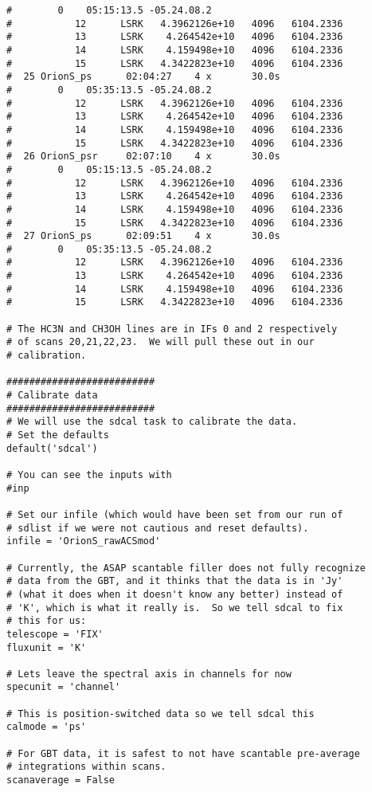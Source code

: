 \begin{verbatim}
#        0    05:15:13.5 -05.24.08.2
#           12      LSRK   4.3962126e+10   4096   6104.2336
#           13      LSRK    4.264542e+10   4096   6104.2336
#           14      LSRK    4.159498e+10   4096   6104.2336
#           15      LSRK   4.3422823e+10   4096   6104.2336
#  25 OrionS_ps      02:04:27    4 x       30.0s
#        0    05:35:13.5 -05.24.08.2
#           12      LSRK   4.3962126e+10   4096   6104.2336
#           13      LSRK    4.264542e+10   4096   6104.2336
#           14      LSRK    4.159498e+10   4096   6104.2336
#           15      LSRK   4.3422823e+10   4096   6104.2336
#  26 OrionS_psr     02:07:10    4 x       30.0s
#        0    05:15:13.5 -05.24.08.2
#           12      LSRK   4.3962126e+10   4096   6104.2336
#           13      LSRK    4.264542e+10   4096   6104.2336
#           14      LSRK    4.159498e+10   4096   6104.2336
#           15      LSRK   4.3422823e+10   4096   6104.2336
#  27 OrionS_ps      02:09:51    4 x       30.0s
#        0    05:35:13.5 -05.24.08.2
#           12      LSRK   4.3962126e+10   4096   6104.2336
#           13      LSRK    4.264542e+10   4096   6104.2336
#           14      LSRK    4.159498e+10   4096   6104.2336
#           15      LSRK   4.3422823e+10   4096   6104.2336

# The HC3N and CH3OH lines are in IFs 0 and 2 respectively
# of scans 20,21,22,23.  We will pull these out in our
# calibration.

##########################
# Calibrate data
##########################
# We will use the sdcal task to calibrate the data.
# Set the defaults
default('sdcal')

# You can see the inputs with
#inp

# Set our infile (which would have been set from our run of
# sdlist if we were not cautious and reset defaults).
infile = 'OrionS_rawACSmod'

# Currently, the ASAP scantable filler does not fully recognize
# data from the GBT, and it thinks that the data is in 'Jy'
# (what it does when it doesn't know any better) instead of
# 'K', which is what it really is.  So we tell sdcal to fix
# this for us:
telescope = 'FIX'
fluxunit = 'K'

# Lets leave the spectral axis in channels for now
specunit = 'channel'

# This is position-switched data so we tell sdcal this
calmode = 'ps'

# For GBT data, it is safest to not have scantable pre-average
# integrations within scans.
scanaverage = False


\end{verbatim}

